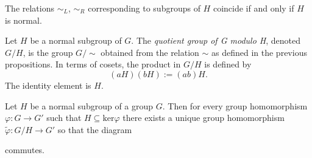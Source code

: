 \begin{proposition}
The relations $\sim_L$, $\sim_R$ corresponding to subgroups of $H$ coincide if and only if $H$ is normal.
\end{proposition}

\label{definitionofquotientgroup}

Let $H$ be a normal subgroup of $G$. The \emph{quotient group of G modulo H}, denoted $G/H$, is the group $G/\sim$
obtained from the relation $\sim$ as defined in the previous propositions. In terms of cosets, the product in $G/H$
is defined by
$$(aH)(bH) := (ab)H.$$
The identity element is $H$.

\begin{theorem}
\label{universalpropertyofquotientgroups}
Let $H$ be a normal subgroup of a group $G$. Then for every group homomorphism $\varphi : G \rightarrow G'$ such that
$H \subseteq \textrm{ker} \varphi$ there exists a unique group homomorphism $\tilde \varphi: G/H \rightarrow G'$ so that
the diagram

\begin{figure}[H]
\centering

\end{figure}

\noindent commutes.
\end{theorem}